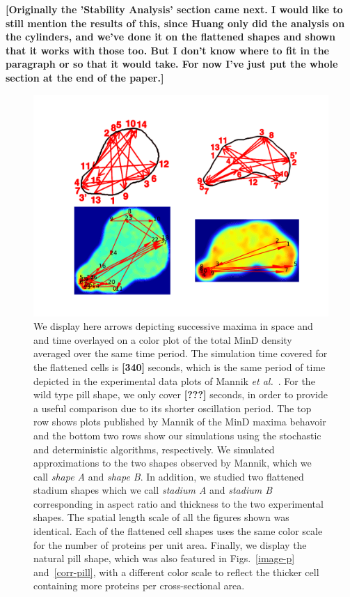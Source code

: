 \documentclass[letterpaper,twocolumn,amsmath,amssymb,pre]{revtex4-1}
\newcommand{\red}[1]{{\bf \color{red} #1}}
\newcommand{\fixme}[1]{\red{[#1]}}
\begin{document}
\fixme{Originally the 'Stability Analysis' section came next.  I would
  like to still mention the results of this, since Huang only did the
  analysis on the cylinders, and we've done it on the flattened shapes
  and shown that it works with those too.  But I don't know where to
  fit in the paragraph or so that it would take.  For now I've just
  put the whole section at the end of the paper.}

\begin{figure}
  \centering
  \includegraphics[width=\textwidth]{../paper/plot-ave}
  \caption{We display here arrows depicting successive maxima in space
    and and time overlayed on a color plot of the total MinD density
    averaged over the same time period.  The simulation time covered
    for the flattened cells is \fixme{340} seconds, which is the same
    period of time depicted in the experimental data plots of Mannik
    \emph{et al.}~\cite{mannik2012robustness}.  For the wild type pill
    shape, we only cover \fixme{???} seconds, in order to provide a
    useful comparison due to its shorter oscillation period.  The top
    row shows plots published by Mannik of the MinD maxima behavoir
    and the bottom two rows show our simulations using the stochastic
    and deterministic algorithms, respectively.  We simulated
    approximations to the two shapes observed by Mannik, which we call
    \emph{shape A} and \emph{shape B}.  In addition, we studied two
    flattened stadium shapes which we call \emph{stadium A} and
    \emph{stadium B} corresponding in aspect ratio and thickness to
    the two experimental shapes.  The spatial length scale of all the
    figures shown was identical. Each of the flattened cell shapes
    uses the same color scale for the number of proteins per unit
    area.  Finally, we display the natural pill shape, which was also
    featured in Figs.~\ref{image-p} and~\ref{corr-pill}, with a
    different color scale to reflect the thicker cell containing more
    proteins per cross-sectional area.  }
  \label{randst-plot-ave}
\end{figure}
\end{document}

